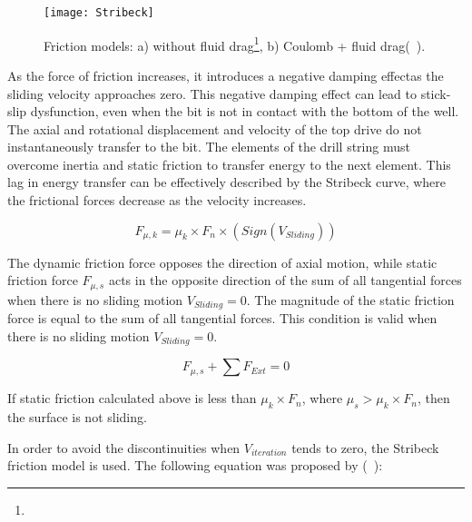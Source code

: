 \begin{figure}
  \centering
  \texttt{[image: Stribeck]}
  \caption[Comparison of friction models]{Friction models: a) without fluid drag\footnote{}, b) Coulomb + fluid drag\footnotemark[\value{footnote}] (~\cite{ref:cayeux2020a}). }
  \label{Friction models}
\end{figure}

As the force of friction increases, it introduces a negative damping effect\needsclarification[How so?]as the sliding velocity approaches zero. This negative damping effect can lead to stick-slip dysfunction, even when the bit is not in contact with the bottom of the well. The axial and rotational displacement and velocity of the top drive do not instantaneously transfer to the bit. The elements of the drill string must overcome inertia and static friction to transfer energy to the next element. This lag in energy transfer can be effectively described by the Stribeck curve, where the frictional forces decrease as the velocity increases.

\begin{equation}\label{dyanmic_force}
  F_{\mu,k} = \mu_{k}\times F_{n} \times (Sign(V_{Sliding}))
\end{equation}

The dynamic friction force opposes the direction of axial motion, while static friction force $F_{\mu,s}$ acts in the opposite direction of the sum of all tangential forces when there is no sliding motion $V_{Sliding}=0$. The magnitude of the static friction force is equal to the sum of all tangential forces. This condition is valid when there is no sliding motion $V_{Sliding}=0$.

\begin{equation}\label{zero}
  F_{\mu,s} + \sum F_{Ext} = 0
\end{equation}

If static friction calculated above is less than $\mu_{k}\times F_{n}$, where $\mu_{s} > \mu_{k}\times F_{n}$, then the surface is not sliding.

In order to avoid the discontinuities when $V_{iteration}$ tends to zero, the Stribeck friction model is used. The following equation was proposed by (~\cite{ref:tustin1947a}):

